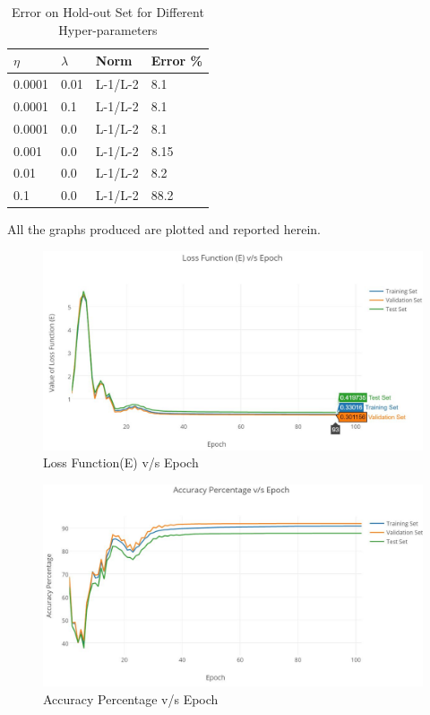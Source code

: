 \documentclass{article}
\begin{document}
\begin{table}[h!]
  \caption{Error on Hold-out Set for Different Hyper-parameters}
  \label{table1}
  \centering
  \begin{tabular}{llll}
    \toprule
    $\eta$     & $\lambda$     & Norm     & Error \% \\
    \midrule
    0.0001     & 0.01     & L-1/L-2     & 8.1  \\
    0.0001     & 0.1     & L-1/L-2     & 8.1     \\
    0.0001     & 0.0     & L-1/L-2     & 8.1      \\
    0.001     & 0.0     & L-1/L-2     & 8.15  \\
    0.01     & 0.0     & L-1/L-2     & 8.2  \\
    0.1     & 0.0     & L-1/L-2     & 88.2  \\
    \bottomrule
  \end{tabular}
\end{table}

All the graphs produced are plotted and reported herein.

\begin{figure}[h!]
  \includegraphics[width=120mm]{graphs/6b_softmaxLossVsEpoch.JPG}
  \caption{Loss Function(E) v/s Epoch}
  \label{fig:graph 6(b)}
\end{figure}

\begin{figure}[h!]
  \includegraphics[width=120mm]{graphs/6c_softmaxAccuracyVsEpoch.JPG}
  \caption{Accuracy Percentage v/s Epoch}
  \label{fig:graph 6(c)}
\end{figure}
\end{document}
